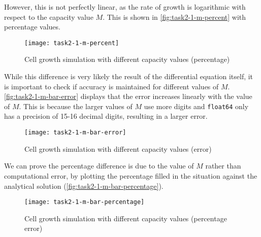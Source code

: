 However, this is not perfectly linear, as the rate of growth is logarithmic with respect to the capacity value $M$.
This is shown in \autoref{fig:task2-1-m-percent} with percentage values.

\begin{figure}[ht]
    \centering
    \texttt{[image: task2-1-m-percent]}
    \caption[Cell growth simulation with different capacity values (percentage)]{Cell growth simulation with different capacity values (percentage)}
    \label{fig:task2-1-m-percent}
\end{figure}





\clearpage

While this difference is very likely the result of the differential equation itself, it is important to check if accuracy is maintained for different values of $M$.
\autoref{fig:task2-1-m-bar-error} displays that the error increases linearly with the value of $M$.
This is because the larger values of $M$ use more digits and \verb|float64| only has a precision of 15-16 decimal digits, resulting in a larger error.

\begin{figure}[ht]
    \centering
    \texttt{[image: task2-1-m-bar-error]}
    \caption[Cell growth simulation with different capacity values (error)]{Cell growth simulation with different capacity values (error) }
    \label{fig:task2-1-m-bar-error}
\end{figure}

We can prove the percentage difference is due to the value of $M$ rather than computational error, by plotting the percentage filled in the situation against the analytical solution (\autoref{fig:task2-1-m-bar-percentage}).

\begin{figure}[ht]
    \centering
    \texttt{[image: task2-1-m-bar-percentage]}
    \caption[Cell growth simulation with different capacity values (percentage error)]{Cell growth simulation with different capacity values (percentage error) }
    \label{fig:task2-1-m-bar-percentage}
\end{figure}

